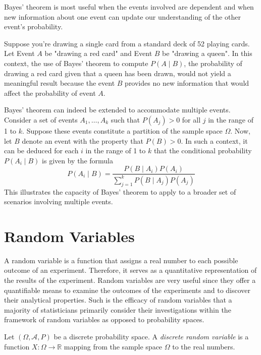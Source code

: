 Bayes' theorem is most useful when the events involved are dependent and when new information about one event can update our understanding of the other event's probability.

\begin{example}
Suppose you're drawing a single card from a standard deck of 52 playing cards. Let Event $A$ be "drawing a red card" and Event $B$ be "drawing a queen". In this context, the use of Bayes' theorem to compute $P(A \mid B)$, the probability of drawing a red card given that a queen has been drawn, would not yield a meaningful result because the event $B$ provides no new information that would affect the probability of event $A$.
\end{example}

Bayes' theorem can indeed be extended to accommodate multiple events. Consider a set of events $A_{1}, \ldots, A_{k}$ such that $P\left( A_{j} \right)>0$ for all $j$ in the range of 1 to $k$. Suppose these events constitute a partition of the sample space $\Omega$. Now, let $B$ denote an event with the property that $P\left(B\right)>0$. In such a context, it can be deduced for each $i$ in the range of 1 to $k$ that the conditional probability $P\left(A_{i}\mid B\right)$ is given by the formula
\[
P\left(A_{i}\mid B\right)=\frac{P\left(B\mid A_{i}\right) P\left(A_{i}\right)}{\sum_{j=1}^{k} P\left(B \mid A_{j}\right) P\left(A_{j}\right)}
\]
This illustrates the capacity of Bayes' theorem to apply to a broader set of scenarios involving multiple events.

%
%

\section{Random Variables}
\label{sec:probability_random_variables}

A random variable is a function that assigns a real number to each possible outcome of an experiment. Therefore, it serves as a quantitative representation of the results of the experiment. Random variables are very useful since they offer a quantifiable means to examine the outcomes of the experiments and to discover their analytical properties. Such is the efficacy of random variables that a majority of statisticians primarily consider their investigations within the framework of random variables as opposed to probability spaces.

\begin{definition}
Let $\left( \Omega, \mathcal{A} , P \right)$ be a discrete probability space. A \emph{discrete random variable} is a function $X : \Omega \rightarrow \mathbb{R}$ mapping from the sample space $\Omega$ to the real numbers.
\end{definition}

